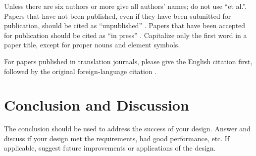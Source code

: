 Unless there are six authors or more give all authors' names; do not use 
``et al.''. Papers that have not been published, even if they have been 
submitted for publication, should be cited as ``unpublished'' \cite{gabriel1996dielectricI}. Papers 
that have been accepted for publication should be cited as ``in press'' \cite{gabriel1996dielectricI}. 
Capitalize only the first word in a paper title, except for proper nouns and 
element symbols.



For papers published in translation journals, please give the English 
citation first, followed by the original foreign-language citation \cite{khadem2019geometric}.












\section{Conclusion and Discussion}
The conclusion should be used to address the success of your design. Answer and discuss if your design met the requirements, had good performance, etc. If applicable, suggest future improvements or applications of the design.












